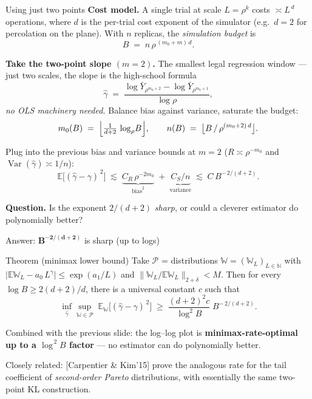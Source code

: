 \documentclass[10pt, aspectratio=169, xcolor={table}]{beamer}
\newcommand{\E}{\mathbb{E}}
\newcommand{\Var}{\operatorname{Var}}
\begin{document}
\begin{frame}{Using just two points}
  \textbf{Cost model.} A single trial at scale $L=\rho^{k}$ costs
  $\asymp L^{\,d}$ operations, where $d$ is the per-trial cost
  exponent of the simulator (e.g.\ $d=2$ for percolation on the plane).
  With $n$ replicas, the \emph{simulation budget} is
  \[
    B \;=\; n\,\rho^{\,(m_0+m)\,d}.
  \]

  \vspace{0.3em}
  \textbf{Take the two-point slope $(m=2)$.} The smallest legal
  regression window --- just two scales, the slope is the high-school
  formula
  \[
    \hat\gamma
    \;=\;
    \frac{\log\bar Y_{\rho^{m_0+2}} - \log\bar Y_{\rho^{m_0+1}}}{\log\rho},
  \]
  \emph{no OLS machinery needed.} Balance bias against variance,
  saturate the budget:
  \[
    m_0(B) \;=\; \Bigl\lfloor\tfrac{1}{d+2}\,\log_\rho\! B \Bigr\rfloor,
    \qquad
    n(B)   \;=\; \bigl\lfloor B\,/\,\rho^{(m_0+2)\,d}\bigr\rfloor.
  \]

  \vspace{0.3em}
  Plug into the previous bias and variance bounds at $m=2$
  ($R\asymp\rho^{-m_0}$ and $\Var(\hat\gamma)\asymp 1/n$):
  \[
    \E\bigl[(\hat\gamma-\gamma)^{\,2}\bigr]
    \;\lesssim\;
    \underbrace{C_R\,\rho^{-2m_0}}_{\text{bias}^2}
    \;+\;
    \underbrace{C_S/n}_{\text{variance}}
    \;\lesssim\;
    C\,B^{-\,2/(d+2)}.
  \]

  \vspace{0.3em}
  \textbf{Question.} Is the exponent $2/(d+2)$ \emph{sharp}, or could
  a cleverer estimator do polynomially better?

\end{frame}

\begin{frame}{Answer: $\boldsymbol{B^{-2/(d+2)}}$ is sharp (up to logs)}
  \begin{block}{Theorem (minimax lower bound)}
    Take $\mathcal{P}$ = distributions $\mathbb{W}=(\mathbb{W}_L)_{L\in\mathbb{N}}$
    with $\bigl|\E\mathbb{W}_L - a_0\, L^{\gamma}\bigr|\le \exp(a_1/L)$
    and $\|\mathbb{W}_L/\E\mathbb{W}_L\|_{2+\delta}<M$. Then for every
    $\log B \ge 2(d+2)/d$, there is a universal constant $c$ such that
    \[
      \inf_{\hat\gamma}\sup_{\mathbb{W}\in\mathcal{P}}\;
        \E_{\mathbb{W}}\!\bigl[(\hat\gamma - \gamma)^{\,2}\bigr]
      \;\ge\;
      \frac{(d+2)^{2}c}{\log^{2}\!B}\;
          B^{-\,2/(d+2)}.
    \]
  \end{block}

  \vspace{0.4em}
  Combined with the previous slide: the log--log plot is
  \textbf{minimax-rate-optimal up to a $\log^{\,2}\!B$ factor} ---
  no estimator can do polynomially better.

  \vspace{0.4em}
  \footnotesize Closely related: [Carpentier \& Kim'15] prove
  the analogous rate for the tail coefficient of \emph{second-order
  Pareto} distributions, with essentially the same two-point KL
  construction.
\end{frame}
\end{document}
